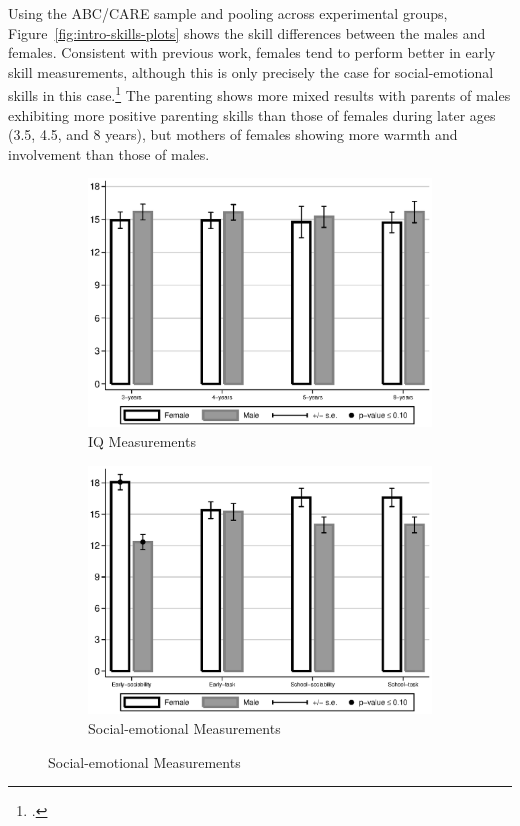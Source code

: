 Using the ABC/CARE sample and pooling across experimental groups, Figure~\ref{fig:intro-skills-plots} shows the skill differences between the males and females. Consistent with previous work, females tend to perform better in early skill measurements, although this is only precisely the case for social-emotional skills in this case.\footnote{\citet{}.} The parenting shows more mixed results with parents of males exhibiting more positive parenting skills than those of females during later ages (3.5, 4.5, and 8 years), but mothers of females showing more warmth and involvement than those of males.

\begin{figure}
\begin{center}
\caption{Differences Between ABC/CARE Males and Females, Skill Measurements}
\label{fig:intro-skills-plots}
\begin{subfigure}[b]{0.49\textwidth}
	\caption{IQ Measurements}
	\label{fig:intro-skills-plots-cog}
	\includegraphics[width=\textwidth]{../output/abccare-gdiff-cog}
\end{subfigure}
\begin{subfigure}[b]{0.49\textwidth}
	\caption{Social-emotional Measurements}
	\label{fig:intro-skills-plots-ncog}
	\includegraphics[width=\textwidth]{../output/abccare-gdiff-ncog}
\end{subfigure}


\end{center}
\end{figure}
